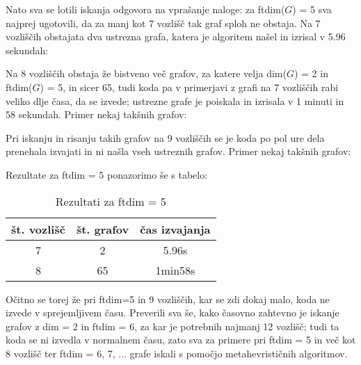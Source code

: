 \documentclass[12pt]{article}
\begin{document}
Nato sva se lotili iskanja odgovora na vprašanje naloge: za ftdim($G$) = 5 sva najprej ugotovili, da za manj kot 7 vozlišč tak graf sploh ne obstaja. Na 7 vozliščih obstajata dva ustrezna grafa, katera je algoritem našel in izrisal v 5.96 sekundah:



Na 8 vozliščih obstaja že bistveno več grafov, za katere velja dim($G$) = 2 in ftdim($G$) = 5, in sicer 65, tudi koda pa v primerjavi z grafi na 7 vozliščih rabi veliko dlje časa, da se izvede; ustrezne grafe je poiskala in izrisala v 1 minuti in 58 sekundah. Primer nekaj takšnih grafov: 


Pri iskanju in risanju takih grafov na 9 vozliščih se je koda po pol ure dela prenehala izvajati in ni našla vseh ustreznih grafov. Primer nekaj takšnih grafov:


Rezultate za ftdim = 5 ponazorimo še s tabelo:

\begin{table}[H] %
 \centering 
 \begin{tabular}{|c|c|c|} 
 \hline 
 \textbf{št. vozlišč} & \textbf{št. grafov} & \textbf{čas izvajanja} \\
 \hline 7 & 2 & 5.96s  \\ 
 \hline 8 & 65 & 1min58s \\
 \hline 
 \end{tabular} 
 \caption{Rezultati za ftdim = 5}
 \label{tab:osebe}
\end{table}



Očitno se torej že pri ftdim=5 in 9 vozliščih, kar se zdi dokaj malo, koda ne izvede v sprejemljivem času. Preverili sva še, kako časovno zahtevno je iskanje grafov z dim = 2 in ftdim = 6, za kar je potrebnih najmanj 12 vozlišč; tudi ta koda se ni izvedla v normalnem času, zato sva za primere pri ftdim = 5 in več kot 8 vozlišč ter ftdim = 6, 7, ... grafe iskali s pomočjo metahevrističnih algoritmov. 
\end{document}
